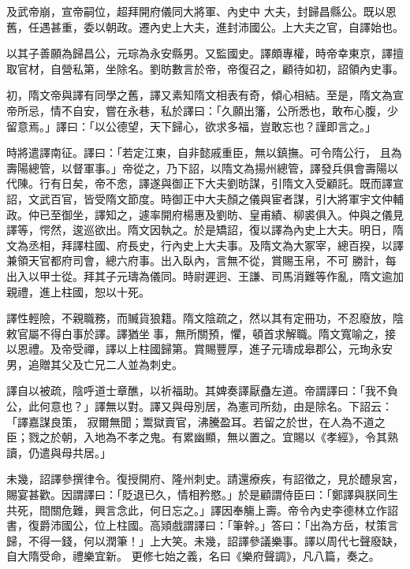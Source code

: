 \begin{pinyinscope}
 及武帝崩，宣帝嗣位，超拜開府儀同大將軍、內史中
 大夫，封歸昌縣公。既以恩舊，任遇甚重，委以朝政。遷內史上大夫，進封沛國公。上大夫之官，自譯始也。



 以其子善願為歸昌公，元琮為永安縣男。又監國史。譯頗專權，時帝幸東京，譯擅取官材，自營私第，坐除名。劉昉數言於帝，帝復召之，顧待如初，詔領內史事。



 初，隋文帝與譯有同學之舊，譯又素知隋文相表有奇，傾心相結。至是，隋文為宣帝所忌，情不自安，嘗在永巷，私於譯曰：「久願出籓，公所悉也，敢布心腹，少留意焉。」譯曰：「以公德望，天下歸心，欲求多福，豈敢忘也？謹即言之。」



 時將遣譯南征。譯曰：「若定江東，自非懿戚重臣，無以鎮撫。可令隋公行，
 且為壽陽總管，以督軍事。」帝從之，乃下詔，以隋文為揚州總管，譯發兵俱會壽陽以代陳。行有日矣，帝不悆，譯遂與御正下大夫劉昉謀，引隋文入受顧託。既而譯宣詔，文武百官，皆受隋文節度。時御正中大夫顏之儀與宦者謀，引大將軍宇文仲輔政。仲已至御坐，譯知之，遽率開府楊惠及劉昉、皇甫績、柳裘俱入。仲與之儀見譯等，愕然，逡巡欲出。隋文因執之。於是矯詔，復以譯為內史上大夫。明日，隋文為丞相，拜譯柱國、府長史，行內史上大夫事。及隋文為大冢宰，總百揆，以譯兼領天官都府司會，總六府事。出入臥內，言無不從，賞賜玉帛，不可
 勝計，每出入以甲士從。拜其子元璹為儀同。時尉遲迥、王謙、司馬消難等作亂，隋文逾加親禮，進上柱國，恕以十死。



 譯性輕險，不親職務，而贓貨狼籍。隋文陰疏之，然以其有定冊功，不忍廢放，陰敕官屬不得白事於譯。譯猶坐事，無所關預，懼，頓首求解職。隋文寬喻之，接以恩禮。及帝受禪，譯以上柱國歸第。賞賜豐厚，進子元璹成皋郡公，元珣永安男，追贈其父及亡兄二人並為刺史。



 譯自以被疏，陰呼道士章醮，以祈福助。其婢奏譯厭蠱左道。帝謂譯曰：「我不負公，此何意也？」譯無以對。譯又與母別居，為憲司所劾，由是除名。下詔云：「譯嘉謀良策，
 寂爾無聞；鬻獄賣官，沸騰盈耳。若留之於世，在人為不道之臣；戮之於朝，入地為不孝之鬼。有累幽顯，無以置之。宜賜以《孝經》，令其熟讀，仍遣與母共居。」



 未幾，詔譯參撰律令。復授開府、隆州刺史。請還療疾，有詔徵之，見於醴泉宮，賜宴甚歡。因謂譯曰：「貶退已久，情相矜愍。」於是顧謂侍臣曰：「鄭譯與朕同生共死，間關危難，興言念此，何日忘之。」譯因奉觴上壽。帝令內史李德林立作詔書，復爵沛國公，位上柱國。高熲戲謂譯曰：「筆幹。」答曰：「出為方岳，杖策言歸，不得一錢，何以潤筆！」上大笑。未幾，詔譯參議樂事。譯以周代七聲廢缺，自大隋受命，禮樂宜新。
 更修七始之義，名曰《樂府聲調》，凡八篇，奏之。




\end{pinyinscope}
